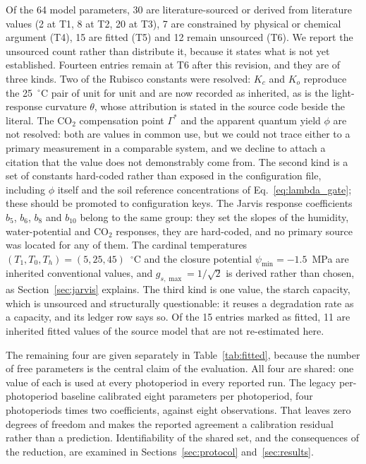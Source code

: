 Of the 64 model parameters, 30 are literature-sourced or derived from literature
values (2 at T1, 8 at T2, 20 at T3), 7 are constrained by physical or chemical
argument (T4), 15 are fitted (T5) and 12 remain unsourced (T6). We report the
unsourced count rather than distribute it, because it states what is not yet
established. Fourteen entries remain at T6 after this revision, and they are of three
kinds. Two of the Rubisco constants were resolved: $K_c$ and $K_o$ reproduce the
25~$^\circ$C pair of \citet{Bernacchi2001} unit for unit and are now recorded as
inherited, as is the light-response curvature $\theta$, whose attribution is
stated in the source code beside the literal. The CO$_2$ compensation point
$\Gamma^{*}$ and the apparent quantum yield $\phi$ are not resolved: both are
values in common use, but we could not trace either to a primary measurement in a
comparable system, and we decline to attach a citation that the value does not
demonstrably come from. The second kind is a set of constants hard-coded rather
than exposed in the configuration file, including $\phi$ itself and the soil
reference concentrations of Eq.~\eqref{eq:lambda_gate}; these should be promoted
to configuration keys. The Jarvis response coefficients $b_5$, $b_6$, $b_8$ and $b_{10}$ belong to the
same group: they set the slopes of the humidity, water-potential and CO$_2$
responses, they are hard-coded, and no primary source was located for any of
them. The cardinal temperatures $(T_1, T_0, T_h) = (5, 25, 45)$~$^\circ$C and the
closure potential $\psi_{\min} = -1.5$~MPa are inherited conventional values, and
$g_{s,\max} = 1/\sqrt{2}$ is derived rather than chosen, as
Section~\ref{sec:jarvis} explains. The third kind is one value, the starch
capacity, which is unsourced and structurally questionable: it reuses a
degradation rate as a capacity, and its ledger row says so. Of the 15 entries marked as fitted, 11 are
inherited fitted values of the source model that are not re-estimated here.

The remaining four are given separately in Table~\ref{tab:fitted}, because the
number of free parameters is the central claim of the evaluation. All four are
shared: one value of each is used at every photoperiod in every reported run. The
legacy per-photoperiod baseline calibrated eight parameters per photoperiod, four photoperiods
times two coefficients, against eight observations. That leaves zero degrees of
freedom and makes the reported agreement a calibration residual rather than a
prediction. Identifiability of the shared set, and the consequences of the
reduction, are examined in Sections~\ref{sec:protocol} and~\ref{sec:results}.


